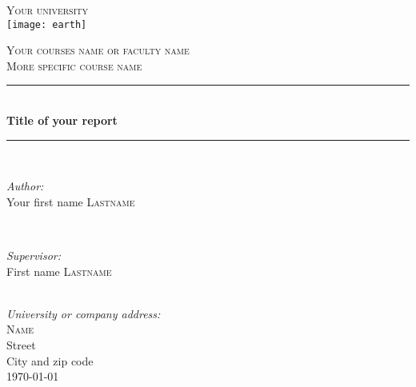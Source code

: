 
\begin{titlepage}

\newcommand{\HRule}{\rule{\linewidth}{0.5mm}} %


\center %

\textsc{\LARGE Your university}\\[1.5cm] %
\texttt{[image: earth]}\par\vspace{1.5cm} %
\textsc{\Large Your courses name or faculty name}\\[0.5cm] %
\textsc{\large More specific course name}\\[0.5cm] %

\HRule \\[1cm]
{ \huge \bfseries Title of your report}\\[0.5cm] %
\HRule \\[1cm]

\begin{minipage}{0.4\textwidth}
\begin{flushleft} \large
\emph{Author:}\\
Your first name \textsc{Lastname} %
\end{flushleft}
\end{minipage}
~
\begin{minipage}{0.4\textwidth}
\begin{flushright} \large
\emph{Supervisor:} \\
First name \textsc{Lastname} %
\end{flushright}
\end{minipage}\\[1.5cm]

\emph{University or company address:} \\
\textsc{Name}\\
Street \\
City and zip code \\[1cm]


{\large \today}\\ %

\vfill %

\end{titlepage}
